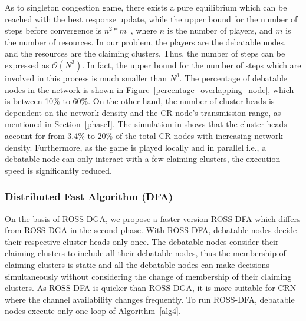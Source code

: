 \documentclass[times]{ettauth}
\newcommand{\ie}{i.e., }
\theoremstyle{mytheoremstyle}
\theoremstyle{mytheoremstyle}
\theoremstyle{mytheoremstyle}
\begin{document}
\begin{itemize}

\end{itemize}


As to singleton congestion game, there exists a pure equilibrium which can be reached with the best response update, while the upper bound for the number of steps before convergence is $n^2*m$~\cite{Ackermann06purenash}, where $n$ is the number of players, and $m$ is the number of resources.
In our problem, the players are the debatable nodes, and the resources are the claiming clusters.
Thus, the number of steps can be expressed as $\mathcal{O}(N^3)$.
%
In fact, the upper bound for the number of steps which are involved in this process is much smaller than $N^3$.
The percentage of debatable nodes in the network is shown in Figure~\ref{percentage_overlapping_node}, which is between 10\% to 60\%.
On the other hand, the number of cluster heads is dependent on the network density and the CR node's transmission range, as mentioned in Section~\ref{phaseI}.
The simulation in \cite{robust_clustering_arxiv} shows that the cluster heads account for from 3.4\% to 20\% of the total CR nodes with increasing network density.
Furthermore, as the game is played locally and in parallel \ie a debatable node can only interact with a few claiming clusters, the execution speed is significantly reduced.


\subsubsection{Distributed Fast Algorithm (DFA)}
On the basis of ROSS-DGA, we propose a faster version ROSS-DFA which differs from ROSS-DGA in the second phase.
With ROSS-DFA, debatable nodes decide their respective cluster heads only once.
The debatable nodes consider their claiming clusters to include all their debatable nodes, thus the membership of claiming clusters is static and all the debatable nodes can make decisions simultaneously without considering the change of membership of their claiming clusters.
As ROSS-DFA is quicker than ROSS-DGA, it is more suitable for CRN where the channel availability changes frequently.
To run ROSS-DFA, debatable nodes execute only one loop of Algorithm~\ref{alg4}.
\end{document}
